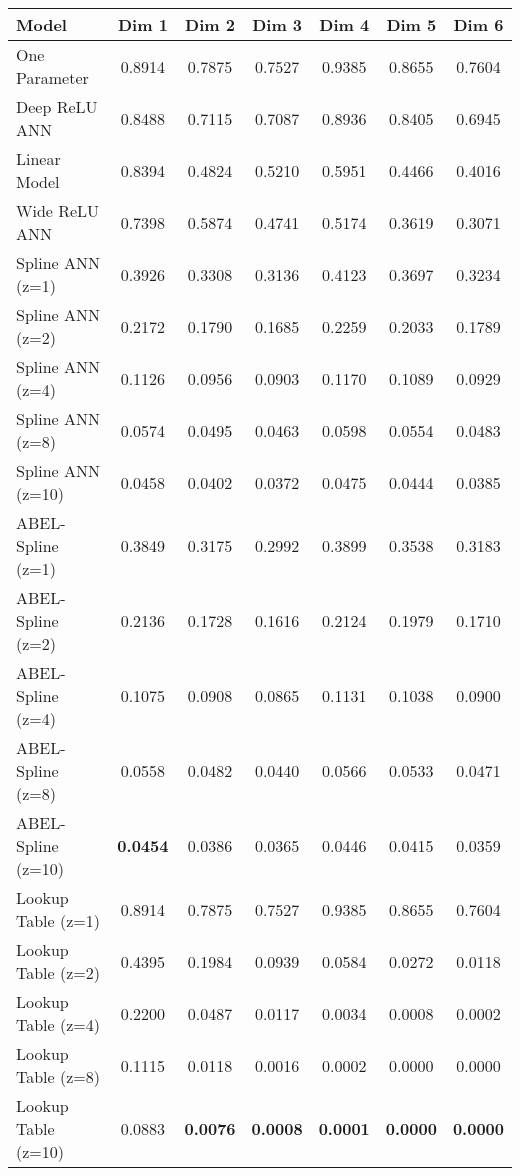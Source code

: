 \begin{table}
\begin{tabular}{|l|c|c|c|c|c|c|}
\hline
Model & Dim 1 & Dim 2 & Dim 3 & Dim 4 & Dim 5 & Dim 6 \\ \hline
One Parameter & 0.8914 & 0.7875 & 0.7527 & 0.9385 & 0.8655 & 0.7604 \\ \hline
Deep ReLU ANN & 0.8488 & 0.7115 & 0.7087 & 0.8936 & 0.8405 & 0.6945 \\ \hline
Linear Model & 0.8394 & 0.4824 & 0.5210 & 0.5951 & 0.4466 & 0.4016 \\ \hline
Wide ReLU ANN & 0.7398 & 0.5874 & 0.4741 & 0.5174 & 0.3619 & 0.3071 \\ \hline
Spline ANN (z=1) & 0.3926 & 0.3308 & 0.3136 & 0.4123 & 0.3697 & 0.3234 \\ \hline
Spline ANN (z=2) & 0.2172 & 0.1790 & 0.1685 & 0.2259 & 0.2033 & 0.1789 \\ \hline
Spline ANN (z=4) & 0.1126 & 0.0956 & 0.0903 & 0.1170 & 0.1089 & 0.0929 \\ \hline
Spline ANN (z=8) & 0.0574 & 0.0495 & 0.0463 & 0.0598 & 0.0554 & 0.0483 \\ \hline
Spline ANN (z=10) & 0.0458 & 0.0402 & 0.0372 & 0.0475 & 0.0444 & 0.0385 \\ \hline
ABEL-Spline (z=1) & 0.3849 & 0.3175 & 0.2992 & 0.3899 & 0.3538 & 0.3183 \\ \hline
ABEL-Spline (z=2) & 0.2136 & 0.1728 & 0.1616 & 0.2124 & 0.1979 & 0.1710 \\ \hline
ABEL-Spline (z=4) & 0.1075 & 0.0908 & 0.0865 & 0.1131 & 0.1038 & 0.0900 \\ \hline
ABEL-Spline (z=8) & 0.0558 & 0.0482 & 0.0440 & 0.0566 & 0.0533 & 0.0471 \\ \hline
ABEL-Spline (z=10) & \textbf{0.0454} & 0.0386 & 0.0365 & 0.0446 & 0.0415 & 0.0359 \\ \hline
Lookup Table (z=1) & 0.8914 & 0.7875 & 0.7527 & 0.9385 & 0.8655 & 0.7604 \\ \hline
Lookup Table (z=2) & 0.4395 & 0.1984 & 0.0939 & 0.0584 & 0.0272 & 0.0118 \\ \hline
Lookup Table (z=4) & 0.2200 & 0.0487 & 0.0117 & 0.0034 & 0.0008 & 0.0002 \\ \hline
Lookup Table (z=8) & 0.1115 & 0.0118 & 0.0016 & 0.0002 & 0.0000 & 0.0000 \\ \hline
Lookup Table (z=10) & 0.0883 & \textbf{0.0076} & \textbf{0.0008} & \textbf{0.0001} & \textbf{0.0000} & \textbf{0.0000} \\ \hline
\end{tabular}
\end{table}
